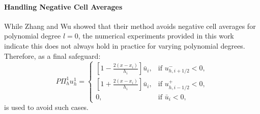 \documentclass[a4paper,12pt]{paper}
\begin{document}
\paragraph{Handling Negative Cell Averages}
While Zhang and Wu \cite{Zhang2009} showed that their method avoids negative cell averages for polynomial degree $l = 0$, the numerical experiments provided in this work indicate this does not always hold in practice for varying polynomial degrees. Therefore, as a final safeguard:
\begin{equation*}
	P \Pi^1_h u_h^1 = 
	\begin{cases}
		\left[1 - \frac{2(x - x_i)}{h_i} \right] \bar{u}_i, & \text{if } u_{h, i+1/2}^{-} < 0, \\
		\left[1 + \frac{2(x - x_i)}{h_i} \right] \bar{u}_i, & \text{if } u_{h, i-1/2}^{+} < 0, \\
		0, & \text{if } \bar{u}_i < 0,
	\end{cases}
\end{equation*}
is used to avoid such cases.
\end{document}
